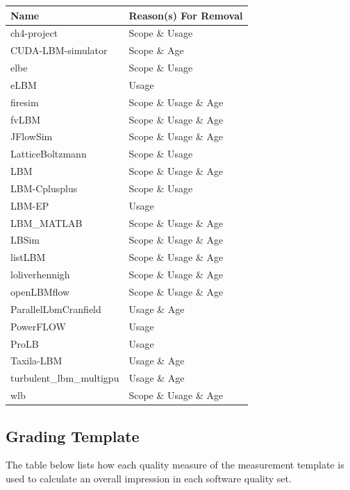 \documentclass[12pt, notitlepage]{article}
\begin{document}
\begin{singlespace}
\begin{center}
	\begin{tabular}{ p{4cm}p{4cm}}
		\hline
		Name & Reason(s) For Removal\\
		\hline
		ch4-project&Scope \& Usage\\
		CUDA-LBM-simulator&Scope \& Age\\
		elbe&Scope \& Usage\\
		eLBM&Usage\\
		firesim&Scope \& Usage \& Age\\
		fvLBM&Scope \& Usage \& Age\\
		JFlowSim&Scope \& Usage \& Age\\
		LatticeBoltzmann&Scope \& Usage\\
		LBM&Scope \& Usage \& Age\\
		LBM-Cplusplus&Scope \& Usage\\
		LBM-EP&Usage\\
		LBM\_MATLAB&Scope \& Usage \& Age\\
		LBSim&Scope \& Usage \& Age\\
		listLBM&Scope \& Usage \& Age\\
		loliverhennigh&Scope \& Usage \& Age\\
		openLBMflow&Scope \& Usage \& Age\\
		ParallelLbmCranfield&Usage \& Age\\
		PowerFLOW&Usage\\
		ProLB&Usage\\
		Taxila-LBM&Usage \& Age\\
		turbulent\_lbm\_multigpu&Usage \& Age\\
		wlb&Scope \& Usage \& Age\\
		\hline
	\end{tabular}
	\label{eliminatedpackages}
\end{center}

\newpage

\subsection{Grading Template}\label{gradingtemplate2}
The table below lists how each quality measure of the measurement template is used to calculate an overall impression in each software quality set.\newline


\end{singlespace}
\end{document}
